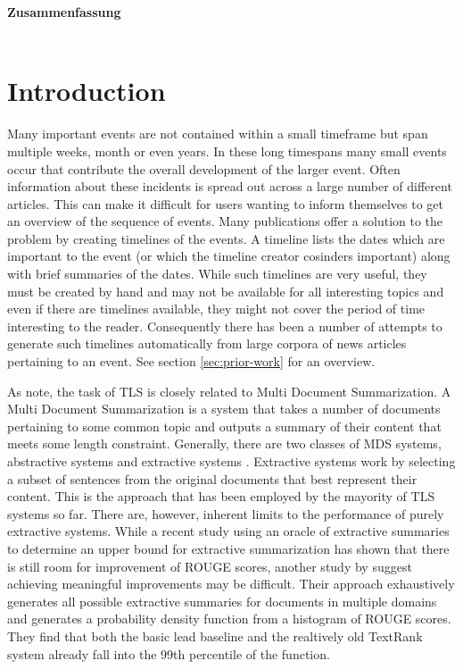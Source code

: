 \documentclass[a4paper,BCOR=10mm]{report}
\begin{document}
\begin{titlepage}
\newpage
\noindent
\Large\textbf{Zusammenfassung}\\
\\

\newpage
\normalsize
\tableofcontents

\end{titlepage}



\chapter{Introduction}

Many important events are not contained within a small timeframe but span multiple weeks, month or even years. In these long timespans many small events occur that contribute the overall development of the larger event. Often information about these incidents is spread out across a large number of different articles. This can make it difficult for users wanting to inform themselves to get an overview of the sequence of events. Many publications offer a solution to the problem by creating timelines of the events. %
A timeline lists the dates which are important to the event (or which the timeline creator cosinders important) along with brief summaries of the dates.
While such timelines are very useful, they must be created by hand and may not be available for all interesting topics and even if there are timelines available, they might not cover the period of time interesting to the reader.
Consequently there has been a number of attempts to generate such timelines automatically from large corpora of news articles pertaining to an event. See section \ref{sec:prior-work} for an overview.

As \citet{markert} note, the task of TLS is closely related to Multi Document Summarization.
A Multi Document Summarization is a system that takes a number of documents pertaining to some common topic and outputs a summary of their content that meets some length constraint. Generally, there are two classes of MDS systems, abstractive systems and extractive systems \citep{a-brief-survey}. Extractive systems work by selecting a subset of sentences from the original documents that best represent their content. This is the approach that has been employed by the mayority of TLS systems so far.
There are, however, inherent limits to the performance of purely extractive systems. While a recent study \citep{hirao+nishino} using an oracle of extractive summaries to determine an upper bound for extractive summarization has shown that there is still room for improvement of ROUGE \citep{lin} scores, another study by \citet{ceylan+mihalcea} suggest achieving meaningful improvements may be difficult. Their approach exhaustively generates all possible extractive summaries for documents in multiple domains and generates a probability density function from a histogram of ROUGE scores. They find that both the basic lead baseline and the realtively old TextRank \citet{textrank} system already fall into the 99th percentile of the function.
\end{document}
